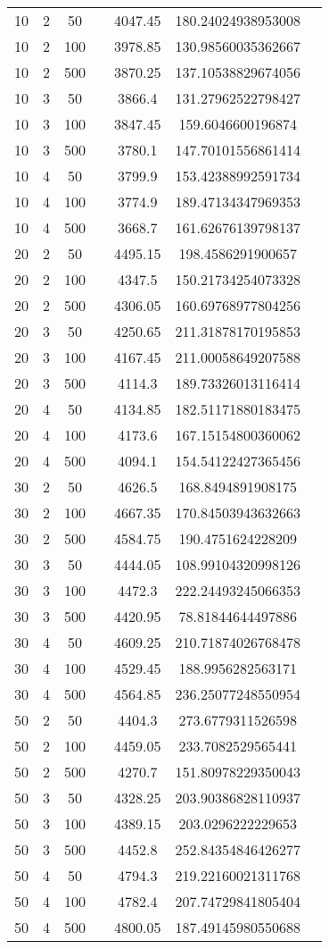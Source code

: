 {\begin{longtabu}{S
S
S
S
S
S[round-mode=places,round-precision=0]
S[round-mode=places,round-precision=0]}
10 & 2 & 50 & & 4047.45 & 180.24024938953008 \\
10 & 2 & 100 & & 3978.85 & 130.98560035362667 \\
10 & 2 & 500 & & 3870.25 & 137.10538829674056 \\
10 & 3 & 50 & & 3866.4 & 131.27962522798427 \\
10 & 3 & 100 & & 3847.45 & 159.6046600196874 \\
10 & 3 & 500 & & 3780.1 & 147.70101556861414 \\
10 & 4 & 50 & & 3799.9 & 153.42388992591734 \\
10 & 4 & 100 & & 3774.9 & 189.47134347969353 \\
10 & 4 & 500 & & 3668.7 & 161.62676139798137 \\
20 & 2 & 50 & & 4495.15 & 198.4586291900657 \\
20 & 2 & 100 & & 4347.5 & 150.21734254073328 \\
20 & 2 & 500 & & 4306.05 & 160.69768977804256 \\
20 & 3 & 50 & & 4250.65 & 211.31878170195853 \\
20 & 3 & 100 & & 4167.45 & 211.00058649207588 \\
20 & 3 & 500 & & 4114.3 & 189.73326013116414 \\
20 & 4 & 50 & & 4134.85 & 182.51171880183475 \\
20 & 4 & 100 & & 4173.6 & 167.15154800360062 \\
20 & 4 & 500 & & 4094.1 & 154.54122427365456 \\
30 & 2 & 50 & & 4626.5 & 168.8494891908175 \\
30 & 2 & 100 & & 4667.35 & 170.84503943632663 \\
30 & 2 & 500 & & 4584.75 & 190.4751624228209 \\
30 & 3 & 50 & & 4444.05 & 108.99104320998126 \\
30 & 3 & 100 & & 4472.3 & 222.24493245066353 \\
30 & 3 & 500 & & 4420.95 & 78.81844644497886 \\
30 & 4 & 50 & & 4609.25 & 210.71874026768478 \\
30 & 4 & 100 & & 4529.45 & 188.9956282563171 \\
30 & 4 & 500 & & 4564.85 & 236.25077248550954 \\
50 & 2 & 50 & & 4404.3 & 273.6779311526598 \\
50 & 2 & 100 & & 4459.05 & 233.7082529565441 \\
50 & 2 & 500 & & 4270.7 & 151.80978229350043 \\
50 & 3 & 50 & & 4328.25 & 203.90386828110937 \\
50 & 3 & 100 & & 4389.15 & 203.0296222229653 \\
50 & 3 & 500 & & 4452.8 & 252.84354846426277 \\
50 & 4 & 50 & & 4794.3 & 219.22160021311768 \\
50 & 4 & 100 & & 4782.4 & 207.74729841805404 \\
50 & 4 & 500 & & 4800.05 & 187.49145980550688 \\
\hline
\end{longtabu}

}
